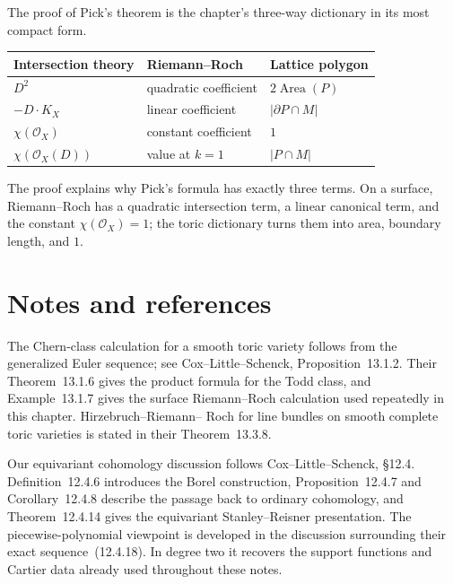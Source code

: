 \begin{threedictionaries}
The proof of Pick's theorem is the chapter's three-way dictionary in
its most compact form.

\medskip

\begin{center}
\small
\begin{tabularx}{\linewidth}{@{}
  >{\raggedright\arraybackslash}X
  >{\raggedright\arraybackslash}X
  >{\raggedright\arraybackslash}X@{}}
\toprule
\textbf{Intersection theory}
& \textbf{Riemann--Roch}
& \textbf{Lattice polygon}
\\
\midrule
\(D^2\)
& quadratic coefficient
& \(2\operatorname{Area}(P)\)
\\
\(-D\cdot K_X\)
& linear coefficient
& \(|\partial P\cap M|\)
\\
\(\chi(\mathcal O_X)\)
& constant coefficient
& \(1\)
\\
\(\chi(\mathcal O_X(D))\)
& value at \(k=1\)
& \(|P\cap M|\)
\\
\bottomrule
\end{tabularx}
\end{center}
\end{threedictionaries}

The proof explains why Pick's formula has exactly three terms.  On a
surface, Riemann--Roch has a quadratic intersection term, a linear
canonical term, and the constant \(\chi(\mathcal O_X)=1\); the toric
dictionary turns them into area, boundary length, and \(1\).

\clearpage
\section*{Notes and references}

The Chern-class calculation for a smooth toric variety follows from
the generalized Euler sequence; see Cox--Little--Schenck,
Proposition~13.1.2.  Their Theorem~13.1.6 gives the product formula for
the Todd class, and Example~13.1.7 gives the surface Riemann--Roch
calculation used repeatedly in this chapter.  Hirzebruch--Riemann--
Roch for line bundles on smooth complete toric varieties is stated in
their Theorem~13.3.8.

Our equivariant cohomology discussion follows Cox--Little--Schenck,
\S12.4.  Definition~12.4.6 introduces the Borel construction,
Proposition~12.4.7 and Corollary~12.4.8 describe the passage back to
ordinary cohomology, and Theorem~12.4.14 gives the equivariant
Stanley--Reisner presentation.  The piecewise-polynomial viewpoint is
developed in the discussion surrounding their exact
sequence~(12.4.18).  In degree two it recovers the support functions
and Cartier data already used throughout these notes.

